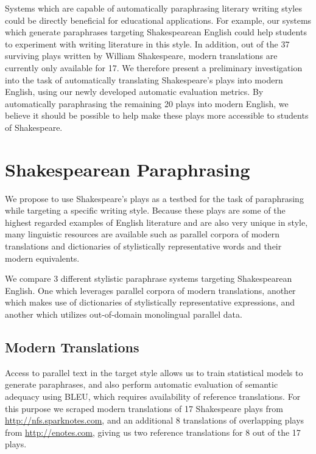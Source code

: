 \documentclass[10pt,a5paper,twoside]{article}
\begin{document}
Systems which are capable of automatically paraphrasing literary writing styles could be directly beneficial for educational applications.  For example, our systems which generate paraphrases targeting
Shakespearean English could help students to experiment with writing literature in this style.
In addition, out of the 37 surviving plays written by William Shakespeare, modern translations are currently only available for 17.  
We therefore present a preliminary investigation into the task of automatically translating Shakespeare's plays into modern English, using our newly developed
automatic evaluation metrics.  By automatically paraphrasing the remaining 20 plays into modern English, 
we believe it should be possible to help make these plays more accessible to students of Shakespeare.

\section{Shakespearean Paraphrasing}
We propose to use Shakespeare's plays as a testbed for the task of paraphrasing while targeting a specific writing style.  Because these plays are some of the
highest regarded examples of English literature and are also very unique in style, many linguistic resources are available such as parallel corpora
of modern translations and dictionaries of stylistically representative words and their modern equivalents.

We compare 3 different stylistic paraphrase systems targeting Shakespearean English.  One which leverages parallel corpora of modern translations, another which makes use
of dictionaries of stylistically representative expressions, and another which utilizes out-of-domain monolingual parallel data.

\subsection{Modern Translations}
Access to parallel text in the target style allows us to train statistical models to generate paraphrases, and also perform automatic evaluation of semantic adequacy using BLEU, which requires availability of reference translations.  For this purpose we scraped modern translations of 17 Shakespeare plays from \url{http://nfs.sparknotes.com}, and an additional 8 translations of overlapping plays from \url{http://enotes.com}, giving us two reference translations for 8 out of the 17 plays.
\end{document}
